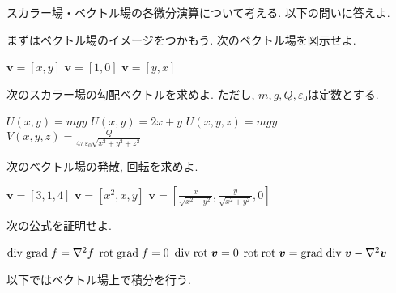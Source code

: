\documentclass[a4j,dvipdfmx]{jsarticle}
\renewcommand{\div}{{\rm div}\hspace{1mm}}
\newcommand{\grad}{{\rm grad}\hspace{1mm}}
\newcommand{\rot}{{\rm rot}\hspace{1mm}}
\begin{document}
        スカラー場・ベクトル場の各微分演算について考える. 以下の問いに答えよ.
        \begin{qparts}
            \qpart まずはベクトル場のイメージをつかもう. 次のベクトル場を図示せよ.
            \begin{qlist}
                \qitem $\bm{v}=[x,y]$
                \qitem $\bm{v}=[1,0]$
                \qitem $\bm{v}=[y,x]$
            \end{qlist}
            \qpart 次のスカラー場の勾配ベクトルを求めよ. ただし, $m,g,Q,\varepsilon_0$は定数とする.
            \begin{qlist}
                \qitem $U(x,y)=mgy$
                \qitem $U(x,y)=2x+y$
                \qitem $U(x,y,z)=mgy$
                \qitem $\displaystyle V(x,y,z)=\frac{Q}{4\pi\varepsilon_0\sqrt{x^2+y^2+z^2}}$
            \end{qlist}
            \qpart 次のベクトル場の発散, 回転を求めよ.
            \begin{qlist}
                \qitem $\bm{v}=[3,1,4]$
                \qitem $\bm{v}=[x^2,x,y]$
                \qitem $\displaystyle \bm{v}=\left[\frac{x}{\sqrt{x^2+y^2}},\frac{y}{\sqrt{x^2+y^2}},0\right]$
            \end{qlist}
            \qpart 次の公式を証明せよ.
            \begin{qlist}
                \qitem $\div\grad f=\nabla^2f$
                \qitem $\rot\grad f = 0$
                \qitem $\div\rot \bm{v}=0$
                \qitem $\rot\rot\bm{v}=\grad\div\bm{v}-\nabla^2\bm{v}$
            \end{qlist}
        \end{qparts}
    \clearpage
        以下ではベクトル場上で積分を行う.
\end{document}
